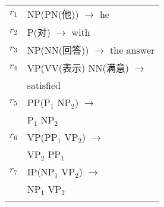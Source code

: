 \begin{minipage}[b]{0.38\textwidth}
{\small
\renewcommand*{\arraystretch}{1.3}
\begin{tabular}{l l}
{$r_1$} & {NP(PN(他)) $\to$  he} \\
{$r_2$} & {P(对) $\to$  with} \\
{$r_3$} & {NP(NN(回答)) $\to$  the answer} \\
{$r_4$} & {VP(VV(表示) NN(满意) $\to$} \\
      & {satisfied} \\
{$r_5$} & {PP(P$_1$ NP$_2$) $\to$} \\
      & {P$_1$ NP$_2$} \\
{$r_6$} & {VP(PP$_1$ VP$_2$) $\to$} \\
      & {VP$_2$ PP$_1$} \\
{$r_7$} & {IP(NP$_1$ VP$_2$) $\to$} \\
      & {NP$_1$ VP$_2$} \\
      & \\
\end{tabular}
\renewcommand*{\arraystretch}{1.0}
}
\end{minipage}